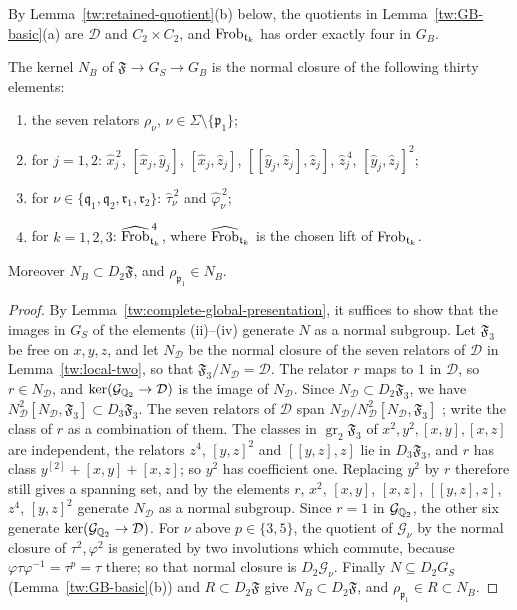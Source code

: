 By Lemma~\ref{tw:retained-quotient}(b) below, the quotients in
Lemma~\ref{tw:GB-basic}(a) are $\mathcal D$ and $C_2\times C_2$, and
$\operatorname{Frob}_{\mathfrak t_k}$ has order exactly four in $G_B$.

\begin{lemma}\label{tw:GB-presentation}
The kernel $N_B$ of $\mathfrak F\to G_S\to G_B$ is the normal closure
of the following thirty elements:
\begin{enumerate}
\item[(i)] the seven relators $\rho_\nu$, $\nu\in\Sigma\setminus\{\mathfrak p_1\}$;
\item[(ii)] for $j=1,2$: $\hat x_j^{\,2}$, $[\hat x_j,\hat y_j]$,
 $[\hat x_j,\hat z_j]$, $[[\hat y_j,\hat z_j],\hat z_j]$, $\hat z_j^{\,4}$,
 $[\hat y_j,\hat z_j]^2$;
\item[(iii)] for $\nu\in\{\mathfrak q_1,\mathfrak q_2,\mathfrak r_1,\mathfrak r_2\}$:
 $\hat\tau_\nu^{\,2}$ and $\hat\varphi_\nu^{\,2}$;
\item[(iv)] for $k=1,2,3$: $\widehat{\operatorname{Frob}}_{\mathfrak t_k}^{\,4}$, where $\widehat{\operatorname{Frob}}_{\mathfrak t_k}$ is the chosen
 lift of $\operatorname{Frob}_{\mathfrak t_k}$.
\end{enumerate}
Moreover $N_B\subset D_2\mathfrak F$, and $\rho_{\mathfrak p_1}\in N_B$.
\end{lemma}

\begin{proof}
By Lemma~\ref{tw:complete-global-presentation}, it suffices to show that the
images in $G_S$ of the elements (ii)--(iv) generate $N$ as a normal
subgroup. Let $\mathfrak F_3$ be free on $x,y,z$, and let $N_{\mathcal D}$ be the normal
closure of the seven relators of $\mathcal D$ in Lemma~\ref{tw:local-two}, so that
$\mathfrak F_3/N_{\mathcal D}=\mathcal D$. The relator $r$ maps to $1$ in $\mathcal D$, so $r\in N_{\mathcal D}$, and
$\ker(\mathcal G_{\mathbb Q_2}\to \mathcal D)$ is the image of $N_{\mathcal D}$. Since
$N_{\mathcal D}\subset D_2\mathfrak F_3$, we have
$N_{\mathcal D}^2[N_{\mathcal D},\mathfrak F_3]\subset D_3\mathfrak F_3$. The seven relators of $\mathcal D$
span $N_{\mathcal D}/N_{\mathcal D}^2[N_{\mathcal D},\mathfrak F_3]$
\cite[Corollary~3.9.3]{NeukirchSchmidtWingberg2008}; write the class of $r$ as
a combination of them. The classes in $\operatorname{gr}_2\mathfrak F_3$ of
$x^2,y^2,[x,y],[x,z]$ are independent, the relators $z^4$, $[y,z]^2$ and
$[[y,z],z]$ lie in $D_3\mathfrak F_3$, and $r$ has class
$y^{[2]}+[x,y]+[x,z]$; so $y^2$ has coefficient one. Replacing $y^2$ by $r$
therefore still gives a spanning set, and by
\cite[Corollary~3.9.3]{NeukirchSchmidtWingberg2008} the elements $r$, $x^2$,
$[x,y]$, $[x,z]$, $[[y,z],z]$, $z^4$, $[y,z]^2$ generate $N_{\mathcal D}$ as a normal
subgroup. Since $r=1$ in $\mathcal G_{\mathbb Q_2}$, the other six generate
$\ker(\mathcal G_{\mathbb Q_2}\to \mathcal D)$. For $\nu$ above $p\in\{3,5\}$, the quotient
of $\mathcal G_\nu$ by the normal closure of $\tau^2,\varphi^2$ is generated
by two involutions which commute, because
$\varphi\tau\varphi^{-1}=\tau^p=\tau$ there; so that normal closure is
$D_2\mathcal G_\nu$. Finally $N\subseteq D_2G_S$
(Lemma~\ref{tw:GB-basic}(b)) and
$R\subset D_2\mathfrak F$ give $N_B\subset D_2\mathfrak F$, and
$\rho_{\mathfrak p_1}\in R\subset N_B$.
\end{proof}

